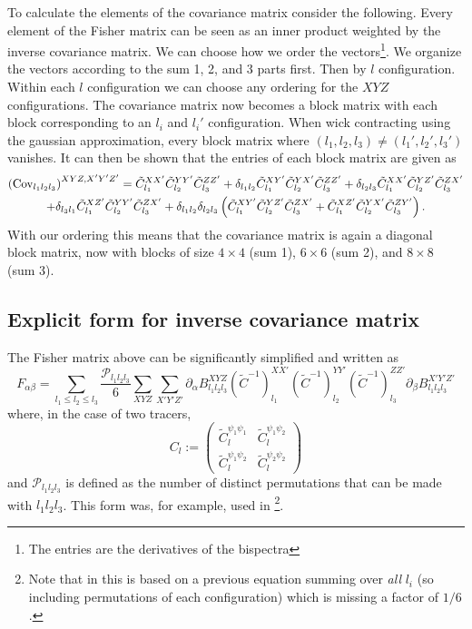 \documentclass[11pt]{article} %
\DeclareRobustCommand{\Cov}{\ifmmode\text{Cov}\else d\fi}
\newcommand{\br}[1]{\ensuremath{\left( #1 \right)}}
\begin{document}
To calculate the elements of the covariance matrix consider the following. Every element of the Fisher matrix can be seen as an inner product weighted by the inverse covariance matrix. We can choose how we order the vectors\footnote{The entries are the derivatives of the bispectra}. We organize the vectors according to the sum 1, 2, and 3 parts first. Then by $l$ configuration. Within each $l$ configuration we can choose any ordering for the $XYZ$ configurations. The covariance matrix now becomes a block matrix with each block corresponding to an $l_i$ and $l_i'$ configuration. When wick contracting using the gaussian approximation, every block matrix where $(l_1,l_2,l_3)\neq (l_1',l_2',l_3')$ vanishes. It can then be shown that the entries of each block matrix are given as
\begin{gather*}
    \br{\Cov_{l_1l_2l_3}}^{XYZ,X'Y'Z'} = \tilde C^{XX'}_{l_1}\tilde C^{YY'}_{l_2}\tilde C^{ZZ'}_{l_3} + \delta_{l_1l_2}\tilde C^{XY'}_{l_1}\tilde C^{YX'}_{l_2}\tilde C^{ZZ'}_{l_3} +\delta_{l_2l_3}\tilde C^{XX'}_{l_1}\tilde C^{YZ'}_{l_2}\tilde C^{ZX'}_{l_3} \\ + \delta_{l_3l_1}\tilde C^{XZ'}_{l_1}\tilde C^{YY'}_{l_2}\tilde C^{ZX'}_{l_3} +\delta_{l_1l_2}\delta_{l_2l_3}\br{\tilde C^{XY'}_{l_1}\tilde C^{YZ'}_{l_2}\tilde C^{ZX'}_{l_3} +\tilde C^{XZ'}_{l_1}\tilde C^{YX'}_{l_2}\tilde C^{ZY'}_{l_3}}.
\end{gather*}
With our ordering this means that the covariance matrix is again a diagonal block matrix, now with blocks of size $4 \times 4$ (sum 1), $6 \times 6$ (sum 2), and $8 \times 8$ (sum 3).

\subsection{Explicit form for inverse covariance matrix}
The Fisher matrix above can be significantly simplified and written as
\begin{equation*}
F_{\alpha\beta} = \sum_{l_1 \leq l_2 \leq l_3} \frac{\mathcal P _{l_1l_2l_3}}{6}
\sum_{XYZ}\sum_{X'Y'Z'} 
\partial_\alpha B^{X Y Z}_{l_1 l_2 l_3} 
(\tilde C^{-1})^{X X'}_{l_1}
(\tilde C^{-1})^{Y Y'}_{l_2}
(\tilde C^{-1})^{Z Z'}_{l_3}
\partial_\beta B^{X' Y' Z'}_{l_1 l_2 l_3}
\end{equation*}
where, in the case of two tracers, 
\begin{equation*}
    C_{l} := \begin{pmatrix}
        \tilde C^{\psi_1\psi_1}_l & \tilde C^{\psi_1\psi_2}_l \\
        \tilde C^{\psi_1\psi_2}_l & \tilde C^{\psi_2\psi_2}_l
    \end{pmatrix}
\end{equation*}
and $\mathcal P_{l_1l_2l_3}$ is defined as the number of distinct permutations that can be made with $l_1l_2l_3$. This form was, for example, used in \cite{Kalaja_2021}\footnote{Note that in \cite{Kalaja_2021} this is based on a previous equation summing over \textit{all} $l_i$ (so including permutations of each configuration) which is missing a factor of $1/6$.}.
\end{document}
